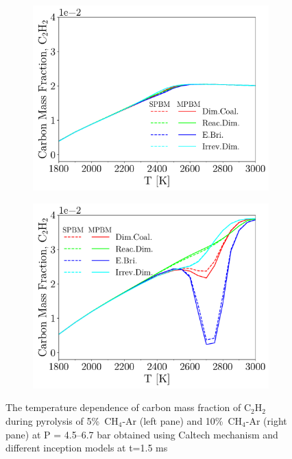 \begin{figure}[!htbp]
	\centering
	\begin{subfigure}[t]{0.4\textwidth}
		\includegraphics[width=1\textwidth]{Figures/Results/Shocktube/Agafonov2016/5CH4/C2H2.pdf}
	\end{subfigure}
	\begin{subfigure}[t]{0.4\textwidth}
		\includegraphics[width=1\textwidth]{Figures/Results/Shocktube/Agafonov2016/10CH4/C2H2.pdf}
	\end{subfigure}
	\caption{The temperature dependence of carbon mass fraction of $\mathrm{C_2H_2}$ during pyrolysis of 5\%~$\mathrm{CH_4}$-Ar (left pane) and 10\%~$\mathrm{CH_4}$-Ar (right pane) at $\mathrm{P}$ = 4.5–6.7 bar obtained using Caltech mechanism and different inception models at t=1.5 ms}
	\label{fig:shocktubeC2H2} 
\end{figure}

